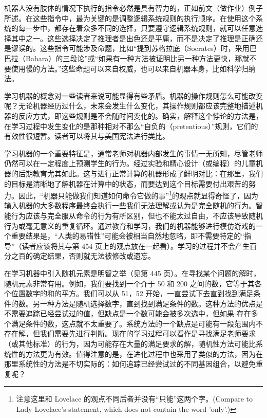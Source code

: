 \documentclass[12pt,a4paper,twoside]{article}
\begin{document}
机器人没有肢体的情况下执行的指令必然是具有智力的，正如前文（做作业）例子所述。在这些指令中，最为关键的是调整逻辑系统规则的执行顺序。在使用这个系统的每一步中，都存在着众多不同的选择，只要遵守逻辑系统规则，就可以任意选择其中之一。这些选择决定了推理者是出色还是平庸，而不是决定了推理是正确还是谬误的。这些指令可能涉及命题，比如“提到苏格拉底（Socrates）时，采用巴巴拉（Babara）的三段论”或“如果有一种方法被证明比另一种方法更快，那就不要使用慢的方法。”这些命题可以来自权威，也可以来自机器本身，比如科学归纳法。

学习机器的概念对一些读者来说可能显得有些矛盾。机器的操作规则怎么可能改变呢？无论机器经历过什么，未来会发生什么变化，其操作规则都应该完整地描述机器的反应方式，即这些规则是不会随时间变化的。确实，解释这个悖论的方法是，在学习过程中发生变化的是那种相对不那么“自负的（pretentious）”规则，它们的有效性很短暂。读者可以将其与美国宪法进行类比。

学习机器的一个重要特征是，通常老师对机器内部发生的事情一无所知，尽管老师仍然可以在一定程度上预测学生的行为。经过实验和精心设计（或编程）的儿童机器的后期教育尤其如此。这与进行正常计算的机器形成了鲜明对比：在那里，我们的目标是清晰地了解机器在计算中的状态，而要达到这个目标需要付出艰苦的努力。因此，“机器只能做我们知道如何命令它做的事”\footnote{注意这里和 Lovelace 的观点不同后者并没有“只能”这两个字。(Compare to Lady Lovelace’s statement, which does not contain the word ’only’.)}的观点就显得奇怪了，因为输入机器的大多数程序最终会执行一些我们无法理解或认为是完全随机的行为。智能行为应该与完全服从命令的行为有所区别，但也不能太过自由，不应该导致随机行为或毫无意义的重复循环。通过教育和学习，我们的机器能够进行模仿游戏的一个重要结果是，“人类的易错性”可能会被相当自然地忽略，即不需要特定的“指导”（读者应该将其与第 454 页上的观点放在一起看）。学习的过程并不会产生百分之百的确定结果，否则就无法被修改或遗忘。

在学习机器中引入随机元素是明智之举（见第 445 页）。在寻找某个问题的解时，随机元素非常有用。例如，我们要找到一个介于 50 和 200 之间的数，它等于其各个位置数字的和的平方。我们可以从 51，52 开始，一直尝试下去直到找到满足条件的数。另一种方法是随机选择数字，直到找到满足条件的数。这种方法的优点是不需要追踪已经尝试过的值，但缺点是一个数可能会被多次选中，但如果 存在多个满足条件的数，这点就不太重要了。系统方法的一个缺点是可能有一段范围内不存在解，但我们需要先进行判断。现在的学习过程可以看作是寻找满足老师要求（或其他标准）的行为，因为可能存在大量的满足要求的解，随机性方法可能比系统性的方法更为有效。值得注意的是，在进化过程中也采用了类似的方法，因为在那里系统性的方法是不切实际的：如何追踪已经尝试过的不同基因组合，以避免重复呢？
\end{document}
